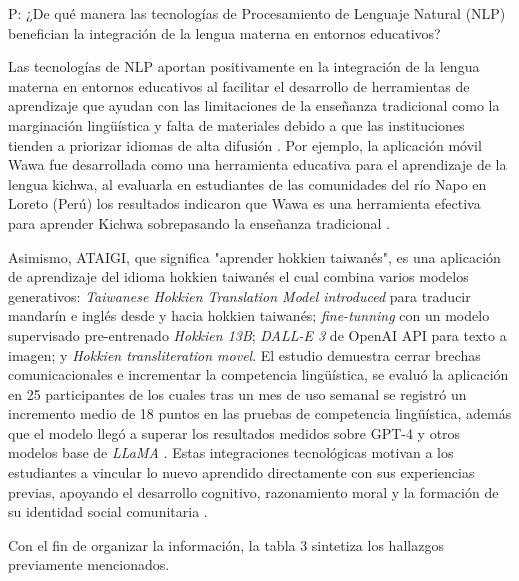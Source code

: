 P: ¿De qué manera las tecnologías de Procesamiento de Lenguaje Natural (NLP) benefician la integración de la lengua materna en entornos educativos?

Las tecnologías de NLP aportan positivamente en la integración de la lengua materna en entornos educativos al facilitar el desarrollo de herramientas de aprendizaje que ayudan con las limitaciones de la enseñanza tradicional como la marginación lingüística y falta de materiales debido a que las instituciones tienden a priorizar idiomas de alta difusión \cite{Wakhare2026}. Por ejemplo, la aplicación móvil Wawa fue desarrollada como una herramienta educativa para el aprendizaje de la lengua kichwa, al evaluarla en estudiantes de las comunidades del río Napo en Loreto (Perú) los resultados indicaron que Wawa es una herramienta efectiva para aprender Kichwa sobrepasando la enseñanza tradicional \cite{Vallejo-Huanga2026}. 

Asimismo, ATAIGI, que significa "aprender hokkien taiwanés", es una aplicación de aprendizaje del idioma hokkien taiwanés el cual combina varios modelos generativos: \textit{Taiwanese Hokkien Translation Model introduced} para traducir mandarín e inglés desde y hacia hokkien taiwanés; \textit{fine-tunning} con un modelo supervisado pre-entrenado \textit{Hokkien 13B}; \textit{DALL-E 3} de OpenAI API para texto a imagen; y \textit{Hokkien transliteration movel}. El estudio demuestra cerrar brechas comunicacionales e incrementar la competencia lingüística, se evaluó la aplicación en 25 participantes de los cuales tras un mes de uso semanal se registró un incremento medio de 18 puntos en las pruebas de competencia lingüística, además que el modelo llegó a superar los resultados medidos sobre GPT-4 y otros modelos base de \textit{LLaMA} \cite{Chu2025}. 
Estas integraciones tecnológicas motivan a los estudiantes a vincular lo nuevo aprendido directamente con sus experiencias previas, apoyando el desarrollo cognitivo, razonamiento moral y la formación de su identidad social comunitaria \cite{Wakhare2026}.

Con el fin de organizar la información, la tabla 3 sintetiza los hallazgos previamente mencionados.

